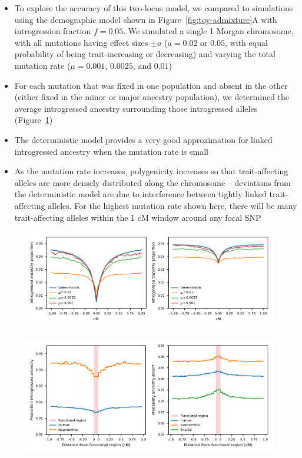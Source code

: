 \documentclass{article}
\begin{document}
\begin{itemize}
    \item To explore the accuracy of this two-locus model, we compared to
        simulations using the demographic model shown in
        Figure~\ref{fig:toy-admixture}A with introgression fraction $f=0.05$.
        We simulated a single 1 Morgan
        chromosome, with all mutations having effect sizes $\pm a$ ($a=0.02$ or
        $0.05$, with equal probability of being trait-increasing or decreasing)
        and varying the total mutation rate ($\mu=0.001$, $0.0025$, and $0.01$)
    \item For each mutation that was fixed in one population and absent in the
        other (either fixed in the minor or major ancestry population), we
        determined the average introgressed ancestry surrounding those introgressed
        alleles (Figure~\ref{fig:linkage-sim})
    \item The deterministic model provides a very good approximation for linked
        introgressed ancestry when the mutation rate is small
    \item As the mutation rate increases, polygenicity increases so that
        trait-affecting alleles are more densely distributed along the chromosome --
        deviations from the deterministic model are due to interference between
        tightly linked trait-affecting alleles. For the highest mutation rate shown
        here, there will be many trait-affecting alleles within the 1 cM window
        around any focal SNP
\end{itemize}

\begin{figure}[t!]
    \centering
    \includegraphics{../figures/linkage_simulation.pdf}
    \caption{
        \textbf{}
    }
    \label{fig:linkage-sim}
\end{figure}

\begin{figure}[t!]
    \centering
    \includegraphics{../figures/introgression_deserts.SD_0.02.pdf}
    \caption{
        \textbf{}
    }
    \label{fig:deserts}
\end{figure}
\end{document}
